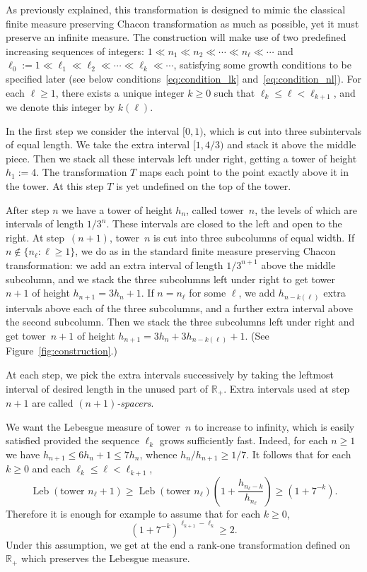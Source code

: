 \documentclass[10pt]{amsart}
\theoremstyle{definition}\newtheorem{defi}[theo]{Definition}\newtheorem{rema}[theo]{Remark}\newtheorem{exam}[theo]{Example}\newtheorem{exem}[theo]{Example}\newtheorem{nota}[theo]{Notation}
\DeclareMathOperator{\Leb}{Leb}
\newcommand{\egdef}{:=}
\newcommand{\RR}{\mathbb{R}}
\begin{document}
As previously explained, this transformation is designed to mimic the classical finite measure preserving Chacon transformation as much as possible, yet it must preserve an infinite measure. The construction will make use of two predefined increasing sequences of integers: $1\ll n_1 \ll n_2 \ll \cdots \ll n_\ell \ll \cdots$ and $\ell_0:=1\ll \ell_1\ll \ell_2\ll\cdots\ll\ell_k\ll\cdots$, satisfying some growth conditions to be specified later (see below conditions~\eqref{eq:condition_lk} and~\eqref{eq:condition_nl}). For each $\ell\ge1$, there exists a unique integer $k\ge0$ such that $\ell_k\le \ell <\ell_{k+1}$, and we denote this integer by $k(\ell)$.

In the first step we consider the interval $[0,1)$, which is cut into three subintervals of equal length. We take the extra interval $[1,4/3)$ and stack it above the middle piece. Then we stack all these intervals left under right, getting a tower of height $h_1\egdef4$. The transformation $T$ maps each point to the point exactly above it in the tower. At this step $T$ is yet undefined on the top of the tower.

After step $n$ we have a tower of height $h_n$, called tower~$n$, the levels of which are intervals of length $1/3^n$. These intervals are closed to the left and open to the right. At step~$(n+1)$, tower~$n$ is cut into three subcolumns of equal width. If $n\notin\{n_\ell:\ell\ge1\}$, we do as in the standard finite measure preserving Chacon transformation: we add an extra interval of length $1/3^{n+1}$ above the middle subcolumn, and we stack the three subcolumns left under right to get tower~$n+1$ of height $h_{n+1}=3h_n+1$. If $n=n_\ell$ for some $\ell$, we add $h_{n-k(\ell)}$ extra intervals above each of the three subcolumns, and a further extra interval above the second subcolumn. Then we stack the three subcolumns left under right and get tower~$n+1$ of height $h_{n+1}=3h_n + 3h_{n-k(\ell)} + 1$. (See Figure~\ref{fig:construction}.)

At each step, we pick the extra intervals successively by taking the leftmost interval of desired length in the unused part of $\RR_+$. Extra intervals used at step $n+1$ are called \emph{$(n+1)$-spacers}.

We want the Lebesgue measure of tower~$n$ to increase to infinity, which is easily satisfied provided the sequence $\ell_k$ grows sufficiently fast. Indeed, for each $n\ge1$ we have $ h_{n+1} \le 6h_n+1 \le 7h_n$, whence ${h_n}/{h_{n+1}}\ge 1/7$. It follows that for each $k\ge0$ and each $\ell_k\le
\ell<\ell_{k+1}$,
\[
\Leb(\text{tower }n_\ell+1)\ge \Leb(\text{tower }n_\ell)\left(1+\frac{h_{n_\ell-k}}{h_{n_\ell}}\right) \ge
\left(1+7^{-k}\right).
\]
Therefore it is enough for example to assume that for each $k\ge0$,
\begin{equation}\label{eq:condition_lk}
\left(1+7^{-k}\right)^{\ell_{k+1}-\ell_k}\ge 2.
\end{equation}
Under this assumption, we get at the end a rank-one transformation defined on $\RR_+$ which preserves the Lebesgue measure.
\end{document}
